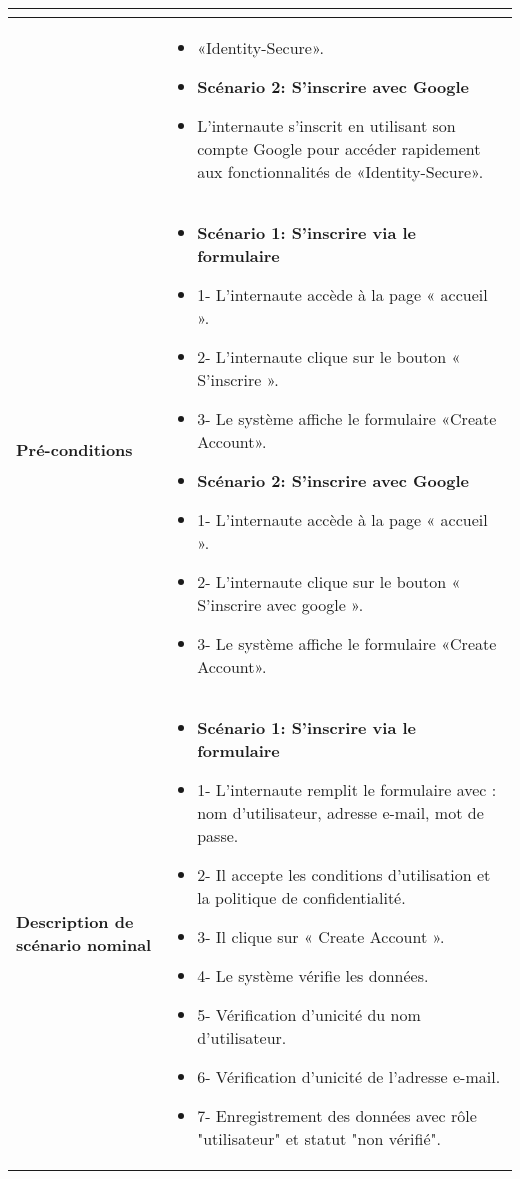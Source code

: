 \begin{longtable}{|>{\arraybackslash}p{4.2cm}|>{\arraybackslash}p{12.5cm}|}
\begin{itemize}[label=]
\end{itemize} \\
\hline
\textbf{} &
\begin{itemize}[label=]
    \item «Identity-Secure».
    \item \textbf{Scénario 2: S'inscrire avec Google}
    \item L'internaute s'inscrit en utilisant son compte Google pour accéder rapidement aux fonctionnalités de «Identity-Secure».
\end{itemize}\\
\hline
\textbf{Pré-conditions} &
\begin{itemize}[label=]
    \item \textbf{Scénario 1: S'inscrire via le formulaire}
    \item 1- L'internaute accède à la page « accueil ».
    \item 2- L'internaute clique sur le bouton « S'inscrire ».
    \item 3- Le système affiche le formulaire «Create Account».
    \item \textbf{Scénario 2: S'inscrire avec Google}
    \item 1- L'internaute accède à la page « accueil ».
    \item 2- L'internaute clique sur le bouton « S'inscrire avec google ».
    \item 3- Le système affiche le formulaire «Create Account».
\end{itemize} \\
\hline
\textbf{Description de scénario nominal} &
\begin{itemize}[label=]
    \item \textbf{Scénario 1: S'inscrire via le formulaire}
    \item 1- L'internaute remplit le formulaire avec : nom d'utilisateur, adresse e-mail, mot de passe.
    \item 2- Il accepte les conditions d'utilisation et la politique de confidentialité.
    \item 3- Il clique sur « Create Account ».
    \item 4- Le système vérifie les données.
    \item 5- Vérification d'unicité du nom d'utilisateur.
    \item 6- Vérification d'unicité de l'adresse e-mail.
    \item 7- Enregistrement des données avec rôle "utilisateur" et statut "non vérifié".



\end{itemize}
\end{longtable}
